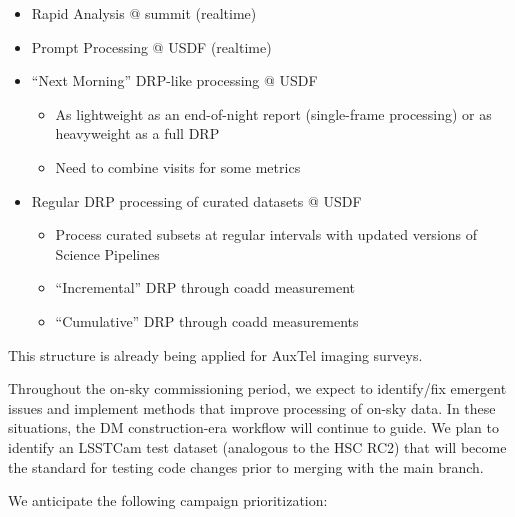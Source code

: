 \documentclass[SE,authoryear,toc,lsstdraft]{lsstdoc}
\begin{document}
\begin{itemize}

  \item Rapid Analysis @ summit (realtime)

  \item Prompt Processing @ USDF (realtime)

  \item “Next Morning” DRP-like processing @ USDF

  \begin{itemize}

    \item As lightweight as an end-of-night report (single-frame processing) or as heavyweight as a full DRP

    \item Need to combine visits for some metrics

  \end{itemize}

  \item Regular DRP processing of curated datasets @ USDF

  \begin{itemize}

    \item Process curated subsets at regular intervals with updated versions of Science Pipelines

    \item ``Incremental'' DRP through coadd measurement

    \item ``Cumulative'' DRP through coadd measurements

  \end{itemize}

\end{itemize}

This structure is already being applied for AuxTel imaging surveys.

Throughout the on-sky commissioning period, we expect to identify/fix emergent issues and implement methods that improve processing of on-sky data.
In these situations, the DM construction-era workflow will continue to guide.
We plan to identify an LSSTCam test dataset (analogous to the HSC RC2) that will become the standard for testing
code changes prior to merging with the main branch.

We anticipate the following campaign prioritization:
\end{document}
